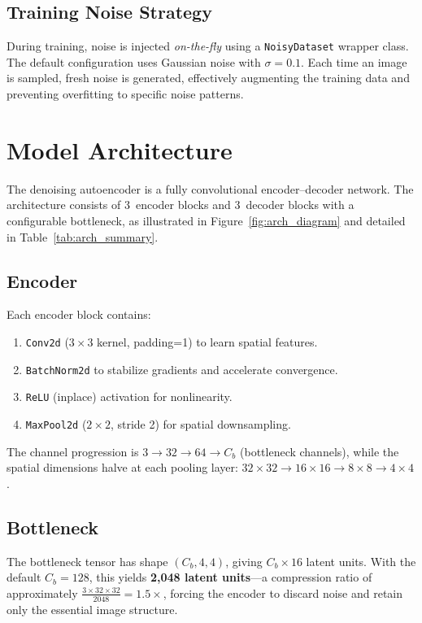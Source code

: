 \documentclass[runningheads]{llncs}
\begin{document}
\subsection{Training Noise Strategy}
During training, noise is injected \textit{on-the-fly} using a \texttt{NoisyDataset} wrapper class. The default configuration uses Gaussian noise with $\sigma=0.1$. Each time an image is sampled, fresh noise is generated, effectively augmenting the training data and preventing overfitting to specific noise patterns.


\section{Model Architecture}
\label{sec:architecture}

The denoising autoencoder is a fully convolutional encoder--decoder network. The architecture consists of 3~encoder blocks and 3~decoder blocks with a configurable bottleneck, as illustrated in Figure~\ref{fig:arch_diagram} and detailed in Table~\ref{tab:arch_summary}.

\subsection{Encoder}
Each encoder block contains:
\begin{enumerate}[nosep]
    \item \texttt{Conv2d} ($3 \times 3$ kernel, padding=1) to learn spatial features.
    \item \texttt{BatchNorm2d} to stabilize gradients and accelerate convergence.
    \item \texttt{ReLU} (inplace) activation for nonlinearity.
    \item \texttt{MaxPool2d} ($2 \times 2$, stride 2) for spatial downsampling.
\end{enumerate}
The channel progression is $3 \to 32 \to 64 \to C_b$ (bottleneck channels), while the spatial dimensions halve at each pooling layer: $32\!\times\!32 \to 16\!\times\!16 \to 8\!\times\!8 \to 4\!\times\!4$.

\subsection{Bottleneck}
The bottleneck tensor has shape $(C_b, 4, 4)$, giving $C_b \times 16$ latent units. With the default $C_b = 128$, this yields \textbf{2{,}048 latent units}—a compression ratio of approximately $\frac{3 \times 32 \times 32}{2048} = 1.5\times$, forcing the encoder to discard noise and retain only the essential image structure.
\end{document}
